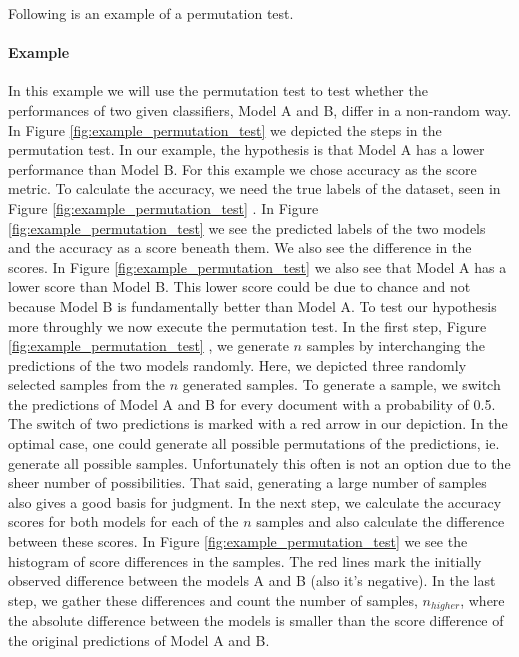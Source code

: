 Following is an example of a permutation test.

\paragraph{Example}
In this example we will use the permutation test to test whether the 
  performances of two given classifiers, Model A and B, differ in a non-random way.
In Figure \ref{fig:example_permutation_test} we depicted the steps in the permutation test. 
In our example, the hypothesis is that Model A has a lower performance than Model B.
For this example we chose accuracy as the score metric.
To calculate the accuracy, we need the true labels of the dataset, seen in Figure \ref{fig:example_permutation_test} \textbf{}.
In Figure \ref{fig:example_permutation_test} \textbf{} we see the predicted labels of the two models and the accuracy as a score beneath them. 
We also see the difference in the scores.
In Figure \ref{fig:example_permutation_test} \textbf{} we also see that Model A has a lower score than Model B.
This lower score could be due to chance and not because Model B is fundamentally better than Model A.
To test our hypothesis more throughly we now execute the permutation test.
In the first step, Figure \ref{fig:example_permutation_test} \textbf{}, we generate $n$ samples by interchanging the predictions of the two models randomly.
Here, we depicted three randomly selected samples from the $n$ generated samples.
To generate a sample, we switch the predictions of Model A and B for every document with a probability of 0.5.
The switch of two predictions is marked with a red arrow in our depiction.
In the optimal case, one could generate all possible permutations of the predictions, ie. generate all possible samples.
Unfortunately this often is not an option due to the sheer number of possibilities. That said, generating a large number of samples also gives a good basis for judgment.
In the next step, we calculate the accuracy scores for both models for each of the $n$ samples and also calculate the difference between these scores.
In Figure \ref{fig:example_permutation_test} \textbf{} we see the histogram of score differences in the samples.
The red lines mark the initially observed difference between the models A and B (also it's negative).
In the last step, we gather these differences and count the number of samples, $n_{higher}$, where the absolute difference between the models is smaller than the score difference of the original predictions of Model A and B.
